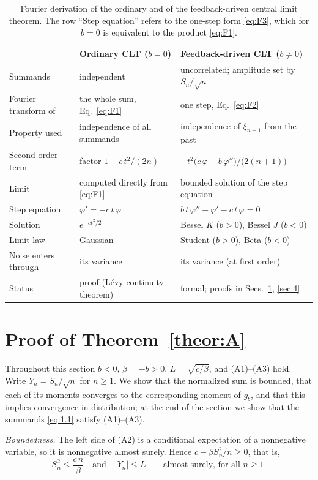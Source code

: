 \documentclass[aip,jmp,preprint,onecolumn,floatfix,superscriptaddress,nofootinbib,11pt]{revtex4-2}
\theoremstyle{plain}
\theoremstyle{remark}
\numberwithin{equation}{section}
\begin{document}
\begin{table}[H]
\caption{Fourier derivation of the ordinary and of the feedback-driven central limit theorem. The row ``Step equation'' refers to the one-step form \eqref{eq:F3}, which for $b=0$ is equivalent to the product \eqref{eq:F1}.}
\label{tab:fourier}
\centering\small
\begin{tabular}{lll}
\toprule
 & Ordinary CLT ($b=0$) & Feedback-driven CLT ($b\ne0$) \\
\midrule
Summands & independent & uncorrelated; amplitude set by $S_n/\sqrt n$ \\
Fourier transform of & the whole sum, Eq.~\eqref{eq:F1} & one step, Eq.~\eqref{eq:F2} \\
Property used & independence of all summands & independence of $\xi_{n+1}$ from the past \\
Second-order term & factor $1-c\,t^{2}/(2n)$ & $-t^{2}\big(c\,\varphi-b\,\varphi''\big)/\big(2(n+1)\big)$ \\
Limit & computed directly from \eqref{eq:F1} & bounded solution of the step equation \\
Step equation & $\varphi'=-c\,t\,\varphi$ & $b\,t\,\varphi''-\varphi'-c\,t\,\varphi=0$ \\
Solution & $e^{-ct^{2}/2}$ & Bessel $K$ ($b>0$), Bessel $J$ ($b<0$) \\
Limit law & Gaussian & Student ($b>0$), Beta ($b<0$) \\
Noise enters through & its variance & its variance (at first order) \\
Status & proof (L\'evy continuity theorem) & formal; proofs in Secs.~\ref{sec:3}, \ref{sec:4} \\
\bottomrule
\end{tabular}
\end{table}
 
\section{Proof of Theorem~\ref{theor:A}}\label{sec:3}
 
Throughout this section $b<0$, $\beta=-b>0$, $L=\sqrt{c/\beta}$, and (A1)--(A3) hold. Write $Y_n=S_n/\sqrt n$ for $n\ge1$. We show that the normalized sum is bounded, that each of its moments converges to the corresponding moment of $g_b$, and that this implies convergence in distribution; at the end of the section we show that the summands \eqref{eq:1.1} satisfy (A1)--(A3).

\textit{Boundedness.} The left side of (A2) is a conditional expectation of a nonnegative variable, so it is nonnegative almost surely. Hence $c-\beta S_n^{2}/n\ge0$, that is,
%
\begin{equation}
S_n^{2}\le \frac{c\,n}{\beta}\quad\text{and}\quad |Y_n|\le L\qquad\text{almost surely, for all }n\ge1.
\label{eq:3.1}
\end{equation}
%
\end{document}
